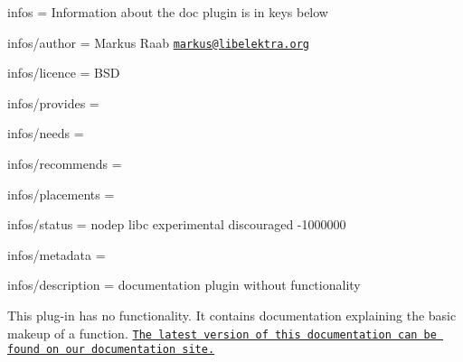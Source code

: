
\begin{DoxyItemize}
\item infos = Information about the doc plugin is in keys below
\item infos/author = Markus Raab \href{mailto:markus@libelektra.org}{\tt markus@libelektra.\+org}
\item infos/licence = B\+S\+D
\item infos/provides =
\item infos/needs =
\item infos/recommends =
\item infos/placements =
\item infos/status = nodep libc experimental discouraged -\/1000000
\item infos/metadata =
\item infos/description = documentation plugin without functionality
\end{DoxyItemize}

This plug-\/in has no functionality. It contains documentation explaining the basic makeup of a function. \href{http://doc.libelektra.org/api/latest/html/group__plugin.html}{\tt The latest version of this documentation can be found on our documentation site.} 